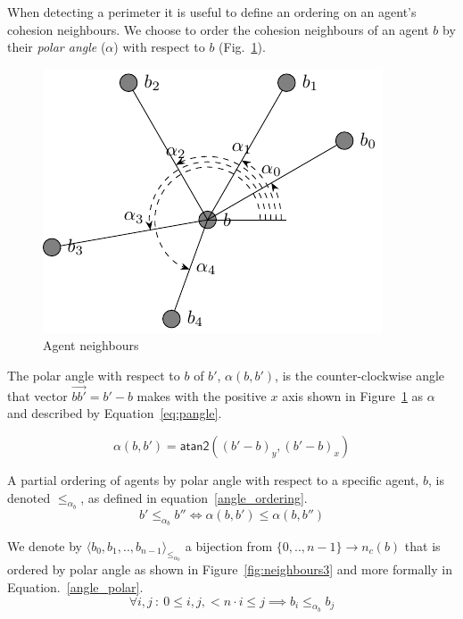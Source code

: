 \documentclass[12pt,a4paper]{IEEEtran}
\newcommand{\vbb}[2]{#2-#1}
\newcommand{\pangle}{\mathit{\alpha}}
\newcommand{\leqaz}[3]{#2 \leq_{\pangle_#1} #3}
\newcommand{\angleordered}[2]{\langle #2 \rangle_{\leqaz{#1}{}{}}}
\begin{document}
When detecting a perimeter it is useful to define an ordering on an agent's cohesion neighbours. We choose to order the cohesion neighbours of an agent $b$ by their \emph{polar
angle} ($\alpha$) with respect to $b$ (Fig.~\ref{fig:neighbours2}). 

\begin{figure}[H]
	\centering
	\includegraphics[width=0.8\linewidth]{figures/neighbours2}
	\caption[Agent neighbours]{Agent neighbours}
	\label{fig:neighbours2}
\end{figure}

The polar angle with respect to $b$ of $b'$,
$\pangle(b, b')$, is the counter-clockwise angle that vector $\vec{bb'} = b' - b$ makes with the positive $x$ axis shown in Figure~\ref{fig:neighbours2} as $\alpha$ and described by Equation~\ref{eq:pangle}.

\begin{equation}\label{eq:pangle}
	\pangle(b, b') = \mathsf{atan2}((\vbb{b}{b'})_y, (\vbb{b}{b'})_x)
\end{equation} 

A partial ordering of agents by polar angle with respect to a specific agent, $b$, is denoted $\leqaz{b}{}{}$, as defined in equation~\ref{angle_ordering}. 
\begin{equation}\label{angle_ordering}
	\leqaz{b}{b'}{b''} \iff \pangle(b, b') \leq \pangle(b, b'')
\end{equation}

We denote by $\angleordered{b}{b_0, b_1, .., b_{n-1}}$ a bijection from $\{0,.., n-1\} \rightarrow n_c(b)$ that is ordered by polar angle as shown in Figure~\ref{fig:neighbours3} and more formally in Equation.~\ref{angle_polar}.
\begin{equation}\label{angle_polar}
	\forall i,
j~:~0 \leq i, j, < n \cdot i \leq j \implies \leqaz{b}{b_i}{b_j}
\end{equation}
\end{document}
